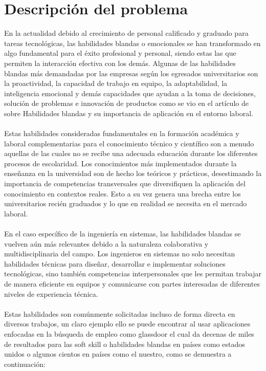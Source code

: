 


\section{Descripción del problema}
En la actualidad debido al crecimiento de personal calificado y graduado para tareas tecnológicas, las habilidades blandas o emocionales se han transformado en algo fundamental para el éxito profesional y personal, siendo estas las que permiten la interacción efectiva con los demás. Algunas de las habilidades blandas más demandadas por las empresas según los egresados universitarios son la proactividad, la capacidad de trabajo en equipo, la adaptabilidad, la inteligencia emocional y demás capacidades que ayudan a la toma de decisiones, solución de problemas e innovación de productos como se vio en el artículo de sobre Habilidades blandas y su importancia de aplicación en el entorno laboral.\cite{d}\\ \\

Estas habilidades consideradas fundamentales en la formación académica y laboral complementarias para el conocimiento técnico y científico son a menudo aquellas de las cuales no se recibe una adecuada educación durante los diferentes procesos de escolaridad. Los conocimientos más implementados durante la enseñanza en la universidad son de hecho los teóricos y prácticos, desestimando la importancia de competencias transversales que diversifiquen la aplicación del conocimiento en contextos reales. Esto a su vez genera una brecha entre los universitarios recién graduados y lo que en realidad se necesita en el mercado laboral.
\\ \\
En el caso específico de la ingeniería en sistemas, las habilidades blandas se vuelven aún más relevantes debido a la naturaleza colaborativa y multidisciplinaria del campo. Los ingenieros en sistemas no solo necesitan habilidades técnicas para diseñar, desarrollar e implementar soluciones tecnológicas, sino también competencias interpersonales que les permitan trabajar de manera eficiente en equipos y comunicarse con partes interesadas de diferentes niveles de experiencia técnica.
\\ \\
Estas habilidades son comúnmente solicitadas incluso de forma directa en diversos trabajos, un claro ejemplo ello se puede encontrar al usar aplicaciones enfocadas en la búsqueda de empleo como glassdoor el cual da decenas de miles de resultados para las soft skill o habilidades blandas en países como estados unidos o algunos cientos en países como el nuestro, como se demuestra a continuación:



